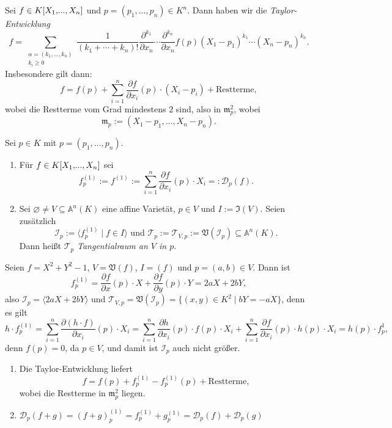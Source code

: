 \documentclass[a4paper,12pt]{scrbook}
\theoremstyle{keinenummern} %
\theoremstyle{mitnummern}
\theoremstyle{unserbeweis}
\def\A{\mathbb{A}}
\def\V{\mathfrak{V}}
\def\I{\mathfrak{I}}
\def\II{\mathcal{I}}
\newcommand{\DD}{\mathcal{D}} %
\def\T{\mathcal{T}}
\def\m{\mathfrak{m}}
\newcommand{\leer}{\ensuremath{\varnothing}}
\let\olddotsc\dotsc %
\renewcommand{\dotsc}{\ensuremath{\!...}}
\newcommand{\polyx}[1][n]{\ensuremath%
  [X_{1},\dotsc,X_{#1}]}
\begin{document}
\begin{erinnerung}\label{3.3.1}
Sei $f\in K\polyx$ und $p=(p_{1},\dotsc,p_{n})\in K^{n}$. Dann haben wir die \emph{Taylor-Entwicklung}
\[f=\!\!\!\!\sum_{\substack{\alpha=(k_{1},\olddotsc,k_{n})\\k_{i}\geq 0}}\!\!\frac{1}{(k_{1}+\dotsm+k_{n})!}\frac{\partial^{k_{1}}}{\partial x_{n}}\dotsm\frac{\partial^{k_{n}}}{\partial x_{n}}f(p)(X_{1}-p_{1})^{k_{1}}\dotsm(X_{n}-p_{n})^{k_{n}}.\]
Insbesondere gilt dann:
\[f=f(p)+\sum_{i=1}^{n}\frac{\partial f}{\partial x_{i}}(p)\cdot(X_{i}-p_{i})+\text{Restterme},\]
wobei die Restterme vom Grad mindestens $2$ sind, also in $\m_{p}^{2}$, wobei
\[\m_{p}:=(X_{1}-p_{1},\dotsc,X_{n}-p_{n}).\]
\end{erinnerung}

\begin{dfn}\label{3.3.2}
Sei $p\in K$ mit $p=(p_{1},\dotsc,p_{n})$.
\begin{enumerate}
\item{} Für $f\in K\polyx$ sei
\[f_{p}^{(1)}:=f^{(1)}:=\sum_{i=1}^{n}\frac{\partial f}{\partial x_{i}}(p)\cdot X_{i}=:\DD_{p}(f).\]
\item{} Sei $\leer\neq V\subseteq\A^{n}(K)$ eine affine Varietät, $p\in V$ und $I:=\I(V)$. Seien zusätzlich
\[\II_{p}:=\langle f_{p}^{(1)}\mid f\in I\rangle\text{ und }\T_{p}:=\T_{V,p}:=\V(\II_{p})\subseteq\A^{n}(K).\]
Dann heißt $\T_{p}$ \emph{Tangentialraum an $V$ in $p$}.
\end{enumerate}\end{dfn}

\begin{bsp}\label{3.3.3}
Seien $f=X^{2}+Y^{2}-1$, $V=\V(f)$, $I=(f)$ und $p=(a,b)\in V$.
Dann ist
\[f_{p}^{(1)}=\frac{\partial f}{\partial x}(p)\cdot X+\frac{\partial f}{\partial y}(p)\cdot Y=2aX + 2bY,\]
also $\II_{p}=\langle 2aX+2bY \rangle$ und $\T_{V,p}=\V(\II_{p})=\{(x,y)\in K^{2}\mid bY=-aX\}$, denn es gilt
\[h\cdot f_{p}^{(1)}=\sum_{i=1}^{n}\frac{\partial(h\cdot f)}{\partial x_{i}}(p)\cdot X_{i}=\sum_{i=1}^{n}\frac{\partial h}{\partial x_{i}}(p)\cdot f(p)\cdot X_{i}+\sum_{i=1}^{n}\frac{\partial f}{\partial x_{i}}(p)\cdot h(p)\cdot X_{i}=h(p)\cdot f_{p}^{1},\]
denn $f(p)=0$, da $p\in V$, und damit ist $\II_{p}$ auch nicht größer.
\end{bsp}

\begin{bem}\label{3.3.4}
\begin{enumerate}
\item Die Taylor-Entwicklung liefert
\[f=f(p)+f_{p}^{(1)}-f_{p}^{(1)}(p)+\text{Restterme},\]
wobei die Restterme in $\m_{p}^{2}$ liegen.
\item $\DD_{p}(f+g)=(f+g)_{p}^{(1)}=f_{p}^{(1)}+g_{p}^{(1)}=\DD_{p}(f)+\DD_{p}(g)$
\end{enumerate}\end{bem}
\end{document}
